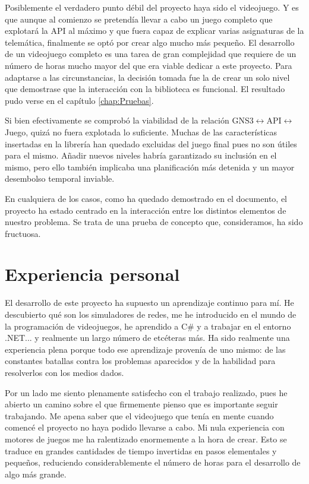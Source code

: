 Posiblemente el verdadero punto débil del proyecto haya sido el videojuego. Y es que aunque al comienzo se pretendía llevar a cabo un juego completo que explotará la API al máximo y que fuera capaz de explicar varias asignaturas de la telemática, finalmente se optó por crear algo mucho más pequeño. El desarrollo de un videojuego completo es una tarea de gran complejidad que requiere de un número de horas mucho mayor del que era viable dedicar a este proyecto. Para adaptarse a las circunstancias, la decisión tomada fue la de crear un solo nivel que demostrase que la interacción con la biblioteca es funcional. El resultado pudo verse en el capítulo \ref{chap:Pruebas}.

Si bien efectivamente se comprobó la viabilidad de la relación GNS3$\leftrightarrow$API$\leftrightarrow$Juego, quizá no fuera explotada lo suficiente. Muchas de las características insertadas en la librería han quedado excluidas del juego final pues no son útiles para el mismo. Añadir nuevos niveles habría garantizado su inclusión en el mismo, pero ello también implicaba una planificación más detenida y un mayor desembolso temporal inviable.

En cualquiera de los casos, como ha quedado demostrado en el documento, el proyecto ha estado centrado en la interacción entre los distintos elementos de nuestro problema. Se trata de una prueba de concepto que, consideramos, ha sido fructuosa.

\section{Experiencia personal}
El desarrollo de este proyecto ha supuesto un aprendizaje continuo para mí. He descubierto qué son los simuladores de redes, me he introducido en el mundo de la programación de videojuegos, he aprendido a C\# y a trabajar en el entorno .NET... y realmente un largo número de etcéteras más. Ha sido realmente una experiencia plena porque todo ese aprendizaje provenía de uno mismo: de las constantes batallas contra los problemas aparecidos y de la habilidad para resolverlos con los medios dados.

Por un lado me siento plenamente satisfecho con el trabajo realizado, pues he abierto un camino sobre el que firmemente pienso que es importante seguir trabajando. Me apena saber que el videojuego que tenía en mente cuando comencé el proyecto no haya podido llevarse a cabo. Mi nula experiencia con motores de juegos me ha ralentizado enormemente a la hora de crear. Esto se traduce en grandes cantidades de tiempo invertidas en pasos elementales y pequeños, reduciendo considerablemente el número de horas para el desarrollo de algo más grande.

